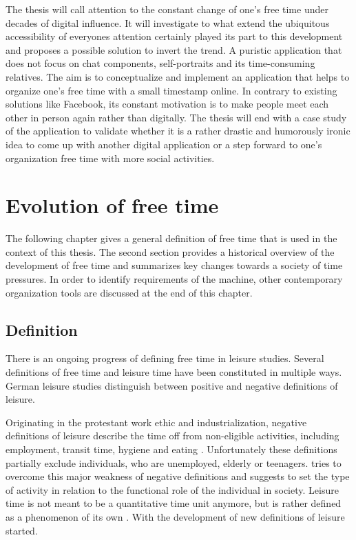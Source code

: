 \documentclass[12pt,numbers=noenddot,parskip,bibliography=totocnumbered,listof=totocnumbered,draft]{scrreprt}
\begin{document}
The thesis will call attention to the constant change of one's free time under decades of digital influence. It will investigate to what extend the ubiquitous accessibility of everyones attention certainly played its part to this development and proposes a possible solution to invert the trend. A puristic application that does not focus on chat components, self-portraits and its time-consuming relatives. The aim is to conceptualize and implement an application that helps to organize one's free time with a small timestamp online. In contrary to existing solutions like Facebook, its constant motivation is to make people meet each other in person again rather than digitally. The thesis will end with a case study of the application to validate whether it is a rather drastic and humorously ironic idea to come up with another digital application or a step forward to one's organization free time with more social activities.

\chapter{Evolution of free time}
The following chapter gives a general definition of free time that is used in the context of this thesis. The second section provides a historical overview of the development of free time and summarizes key changes towards a society of time pressures. In order to identify requirements of the machine, other contemporary organization tools are discussed at the end of this chapter.

\section{Definition}
There is an ongoing progress of defining free time in leisure studies. Several definitions of free time and leisure time have been constituted in multiple ways. German leisure studies distinguish between positive and negative definitions of leisure.

Originating in the protestant work ethic \citep[p.27]{weber2006} and industrialization, negative definitions of leisure describe the time off from non-eligible activities, including employment, transit time, hygiene and eating \citep[p.137]{prahl2002}. Unfortunately these definitions partially exclude individuals, who are unemployed, elderly or teenagers. \citeauthor{scheuch1972} tries to overcome this major weakness of negative definitions and suggests to set the type of activity in relation to the functional role of the individual in society. Leisure time is not meant to be a quantitative time unit anymore, but is rather defined as a phenomenon of its own \citep[p.31]{scheuch1972}. With \citeauthor{scheuch1972} the development of new definitions of leisure started.
\end{document}
